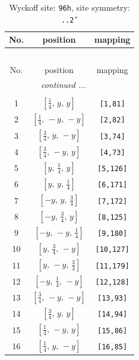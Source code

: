 \documentclass[fleqn,8pt]{jsarticle}
\begin{document}
\begin{longtable}{ccc}
\caption{Wyckoff site: {\tt 96h}, site symmetry: {\tt ..2'}}
 \\
 \hline \hline
No. & position & mapping \\ \hline \endfirsthead

\multicolumn{2}{l}{\tablename\ \thetable{}} \\
 \hline \hline
No. & position & mapping \\ \hline \endhead

 \hline \hline
\multicolumn{2}{r}{\footnotesize\it continued ...} \\ \endfoot

 \hline \hline
\multicolumn{2}{r}{} \\ \endlastfoot

1 & $\left[ \frac{1}{4},\, y,\, y \right]$ & {\tt [1,81]} \\ \hline
2 & $\left[ \frac{1}{4},\, - y,\, - y \right]$ & {\tt [2,82]} \\ \hline
3 & $\left[ \frac{3}{4},\, y,\, - y \right]$ & {\tt [3,74]} \\ \hline
4 & $\left[ \frac{3}{4},\, - y,\, y \right]$ & {\tt [4,73]} \\ \hline
5 & $\left[ y,\, \frac{1}{4},\, y \right]$ & {\tt [5,126]} \\ \hline
6 & $\left[ y,\, y,\, \frac{1}{4} \right]$ & {\tt [6,171]} \\ \hline
7 & $\left[ - y,\, y,\, \frac{3}{4} \right]$ & {\tt [7,172]} \\ \hline
8 & $\left[ - y,\, \frac{3}{4},\, y \right]$ & {\tt [8,125]} \\ \hline
9 & $\left[ - y,\, - y,\, \frac{1}{4} \right]$ & {\tt [9,180]} \\ \hline
10 & $\left[ y,\, \frac{3}{4},\, - y \right]$ & {\tt [10,127]} \\ \hline
11 & $\left[ y,\, - y,\, \frac{3}{4} \right]$ & {\tt [11,179]} \\ \hline
12 & $\left[ - y,\, \frac{1}{4},\, - y \right]$ & {\tt [12,128]} \\ \hline
13 & $\left[ \frac{3}{4},\, - y,\, - y \right]$ & {\tt [13,93]} \\ \hline
14 & $\left[ \frac{3}{4},\, y,\, y \right]$ & {\tt [14,94]} \\ \hline
15 & $\left[ \frac{1}{4},\, - y,\, y \right]$ & {\tt [15,86]} \\ \hline
16 & $\left[ \frac{1}{4},\, y,\, - y \right]$ & {\tt [16,85]} \\ \hline

\end{longtable}
\end{document}
